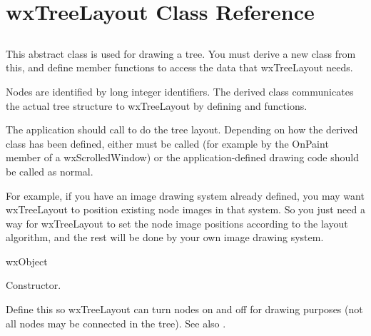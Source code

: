 \chapter{wxTreeLayout Class Reference}
%
\setfooter{\thepage}{}{}{}{}{\thepage}

\section{}\label{wxtreelayout}

This abstract class is used for drawing a tree. You must derive a new
class from this, and define member functions to access the data that
wxTreeLayout needs.

Nodes are identified by long integer identifiers. The derived class
communicates the actual tree structure to wxTreeLayout by defining \rtfsp
and  functions.

The application should call  to do the tree
layout. Depending on how the derived class has been defined, either
\rtfsp{} must be called (for example by the OnPaint member
of a wxScrolledWindow) or the application-defined drawing code should be called
as normal.

For example, if you have an image drawing system already defined, you
may want wxTreeLayout to position existing node images in that system. So you
just need a way for wxTreeLayout to set the node image positions according to
the layout algorithm, and the rest will be done by your own image drawing
system.


wxObject




Constructor.

\label{activatenode}


Define this so wxTreeLayout can turn nodes on and off for drawing purposes
(not all nodes may be connected in the tree). See also .

